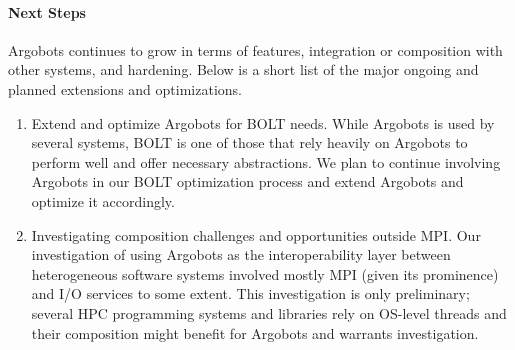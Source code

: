 \paragraph{Next Steps}

Argobots continues to grow in terms of features, integration or
composition with other systems, and hardening. Below is a short
list of the major ongoing and planned extensions and optimizations.

\begin{enumerate}

\item Extend and optimize Argobots for BOLT needs. While Argobots is
used by several systems, BOLT is one of those that rely heavily on
Argobots to perform well and offer necessary abstractions. We plan to
continue involving Argobots in our BOLT optimization process and
extend Argobots and optimize it accordingly.

\item Investigating composition challenges and opportunities outside
MPI. Our investigation of using Argobots as the interoperability layer
between heterogeneous software systems involved mostly MPI (given its
prominence) and I/O services to some extent. This investigation is
only preliminary; several HPC programming systems and libraries rely
on OS-level threads and their composition might benefit for Argobots
and warrants investigation.

\end{enumerate}
